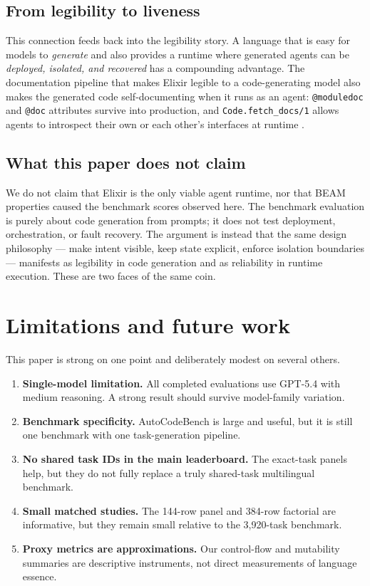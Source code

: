 \documentclass[11pt]{article}
\newcommand{\acb}{AutoCodeBench}
\newcommand{\elixir}{Elixir}
\begin{document}
\subsection{From legibility to liveness}

This connection feeds back into the legibility story. A language that is easy for models to \emph{generate} and also provides a runtime where generated agents can be \emph{deployed, isolated, and recovered} has a compounding advantage. The documentation pipeline that makes \elixir{} legible to a code-generating model also makes the generated code self-documenting when it runs as an agent: \texttt{@moduledoc} and \texttt{@doc} attributes survive into production, and \texttt{Code.fetch\_docs/1} allows agents to introspect their own or each other's interfaces at runtime \cite{codefetchdocs}.

\subsection{What this paper does not claim}

We do not claim that \elixir{} is the only viable agent runtime, nor that BEAM properties caused the benchmark scores observed here. The benchmark evaluation is purely about code generation from prompts; it does not test deployment, orchestration, or fault recovery. The argument is instead that the same design philosophy --- make intent visible, keep state explicit, enforce isolation boundaries --- manifests as legibility in code generation and as reliability in runtime execution. These are two faces of the same coin.

\section{Limitations and future work}

This paper is strong on one point and deliberately modest on several others.

\begin{enumerate}
  \item \textbf{Single-model limitation.} All completed evaluations use GPT-5.4 with medium reasoning. A strong result should survive model-family variation.
  \item \textbf{Benchmark specificity.} \acb{} is large and useful, but it is still one benchmark with one task-generation pipeline.
  \item \textbf{No shared task IDs in the main leaderboard.} The exact-task panels help, but they do not fully replace a truly shared-task multilingual benchmark.
  \item \textbf{Small matched studies.} The 144-row panel and 384-row factorial are informative, but they remain small relative to the 3,920-task benchmark.
  \item \textbf{Proxy metrics are approximations.} Our control-flow and mutability summaries are descriptive instruments, not direct measurements of language essence.
\end{enumerate}
\end{document}
